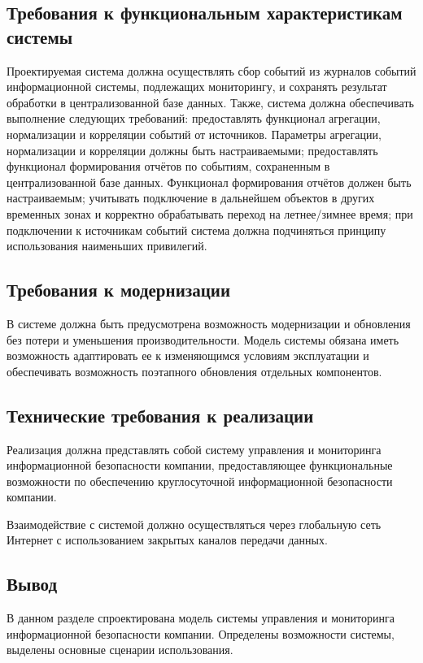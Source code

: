 \subsection{Требования к функциональным характеристикам системы}
Проектируемая система должна осуществлять сбор событий из журналов событий информационной системы, подлежащих мониторингу, и сохранять результат обработки в централизованной базе данных. Также, система должна обеспечивать выполнение следующих требований: предоставлять функционал агрегации, нормализации и корреляции событий от источников. Параметры агрегации, нормализации и корреляции должны быть настраиваемыми; предоставлять функционал формирования отчётов по событиям, сохраненным в централизованной базе данных. Функционал формирования отчётов должен быть настраиваемым; учитывать подключение в дальнейшем объектов в других временных зонах и корректно обрабатывать переход на летнее/зимнее время; при подключении к источникам событий система должна подчиняться принципу использования наименьших привилегий.



\subsection{Требования к модернизации}

В системе должна быть предусмотрена возможность модернизации и обновления без потери и уменьшения производительности. Модель системы обязана иметь возможность адаптировать ее к изменяющимся условиям эксплуатации и обеспечивать возможность поэтапного обновления отдельных компонентов.


\subsection{Технические требования к реализации}

Реализация должна представлять собой систему управления и мониторинга информационной безопасности компании, предоставляющее функциональные возможности по обеспечению круглосуточной информационной безопасности компании.

Взаимодействие с системой должно осуществляться через глобальную сеть Интернет с использованием закрытых каналов передачи данных. 


\subsection{Вывод}
В данном разделе спроектирована модель системы управления и мониторинга информационной безопасности компании. Определены возможности системы, выделены основные сценарии использования.

